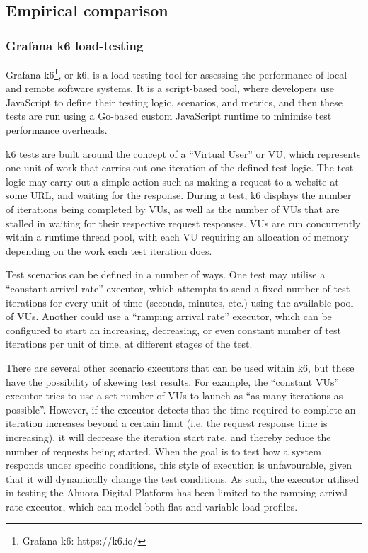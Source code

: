 \subsection{Empirical comparison}
\subsubsection{Grafana k6 load-testing}

Grafana k6\footnote{Grafana k6: https://k6.io/}, or k6, is a load-testing tool for assessing the performance of local and remote software systems. It is a script-based tool, where developers use JavaScript to define their testing logic, scenarios, and metrics, and then these tests are run using a Go-based custom JavaScript runtime to minimise test performance overheads.

k6 tests are built around the concept of a ``Virtual User'' or VU, which represents one unit of work that carries out one iteration of the defined test logic. The test logic may carry out a simple action such as making a request to a website at some URL, and waiting for the response. During a test, k6 displays the number of iterations being completed by VUs, as well as the number of VUs that are stalled in waiting for their respective request responses. VUs are run concurrently within a runtime thread pool, with each VU requiring an allocation of memory depending on the work each test iteration does.

Test scenarios can be defined in a number of ways. One test may utilise a ``constant arrival rate'' executor, which attempts to send a fixed number of test iterations for every unit of time (seconds, minutes, etc.) using the available pool of VUs. Another could use a ``ramping arrival rate'' executor, which can be configured to start an increasing, decreasing, or even constant number of test iterations per unit of time, at different stages of the test.

There are several other scenario executors that can be used within k6, but these have the possibility of skewing test results. For example, the ``constant VUs'' executor tries to use a set number of VUs to launch as ``as many iterations as possible''. However, if the executor detects that the time required to complete an iteration increases beyond a certain limit (i.e. the request response time is increasing), it will decrease the iteration start rate, and thereby reduce the number of requests being started. When the goal is to test how a system responds under specific conditions, this style of execution is unfavourable, given that it will dynamically change the test conditions. As such, the executor utilised in testing the Ahuora Digital Platform has been limited to the ramping arrival rate executor, which can model both flat and variable load profiles.

